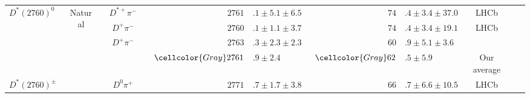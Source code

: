 \begin{adjustbox}{width=0.76\textwidth,center}
{\begin{tabular}{cp{5pt}cp{5pt}cp{5pt}r@{}lp{5pt}r@{}lp{5pt}cp{5pt}c}
		\multirow{4}{*}{$D^{*}(2760)^{0}$}       &                  & \multirow{4}{*}{Natural}     &                  & $D^{*+}\pi^{-}$                 &                       & $	2761$                       & $.1\pm5.1\pm6.5	$                             &                       & $	74$                                            & $.4\pm3.4\pm37.0	$                           &                       & LHCb                                                          &                       & \cite{Aaij:2013sza}                       \\
		                                         &                  &                              &                  & $D^{+}\pi^{-}$                  &                       & $	2760$                       & $.1\pm1.1\pm3.7	$                             &                       & $	74$                                            & $.4\pm3.4\pm19.1	$                           &                       & LHCb                                                          &                       & \cite{Aaij:2013sza}                       \\
		                                         &                  &                              &                  & $D^{+}\pi^{-}$                  &                       & $	2763$                       & $.3\pm2.3\pm2.3	$                             &                       & $	60$                                            & $.9\pm5.1\pm3.6	$                            &                       & \babar{}                                                      &                       & \cite{delAmoSanchez:2010vq}               \\ \cmidrule{6-14}
		                                         &                  &                              &                  &                                 & \cellcolor{Gray}      & $	\cellcolor{Gray} 2761$      & \cellcolor{Gray}$.9 \pm 2.4	$                 & \cellcolor{Gray}      & $	\cellcolor{Gray} 62$                           & \cellcolor{Gray}$.5 \pm 5.9	$                & \cellcolor{Gray}      & \cellcolor{Gray} Our average                                  & \cellcolor{Gray}      &                                           \\ \midrule
		\multirow{3}{*}{$D^{*}(2760)^{\pm}$}     &                  & \multirow{1}{*}{}            &                  & $D^{0}\pi^{+}$                  &                       & $	2771$                       & $.7\pm1.7\pm3.8	$                             &                       & $	66$                                            & $.7\pm6.6\pm10.5	$                           &                       & LHCb                                                          &                       & \cite{Aaij:2013sza}                       \\

\end{tabular}}
\end{adjustbox}
